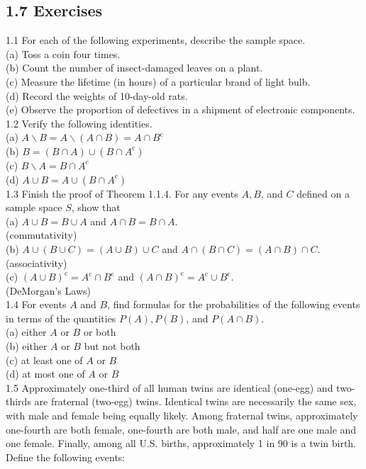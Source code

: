 \documentclass[10pt]{article}
\begin{document}
\subsection*{1.7 Exercises}
1.1 For each of the following experiments, describe the sample space.\\
(a) Toss a coin four times.\\
(b) Count the number of insect-damaged leaves on a plant.\\
(c) Measure the lifetime (in hours) of a particular brand of light bulb.\\
(d) Record the weights of 10-day-old rats.\\
(e) Observe the proportion of defectives in a shipment of electronic components.\\
1.2 Verify the following identities.\\
(a) $A \backslash B=A \backslash(A \cap B)=A \cap B^{\mathrm{c}}$\\
(b) $B=(B \cap A) \cup\left(B \cap A^{\mathrm{c}}\right)$\\
(c) $B \backslash A=B \cap A^{\mathrm{c}}$\\
(d) $A \cup B=A \cup\left(B \cap A^{\mathrm{c}}\right)$\\
1.3 Finish the proof of Theorem 1.1.4. For any events $A, B$, and $C$ defined on a sample space $S$, show that\\
(a) $A \cup B=B \cup A$ and $A \cap B=B \cap A$.\\
(commutativity)\\
(b) $A \cup(B \cup C)=(A \cup B) \cup C$ and $A \cap(B \cap C)=(A \cap B) \cap C$.\\
(associativity)\\
(c) $(A \cup B)^{\mathrm{c}}=A^{\mathrm{c}} \cap B^{\mathrm{c}}$ and $(A \cap B)^{\mathrm{c}}=A^{\mathrm{c}} \cup B^{\mathrm{c}}$.\\
(DeMorgan's Laws)\\
1.4 For events $A$ and $B$, find formulas for the probabilities of the following events in terms of the quantities $P(A), P(B)$, and $P(A \cap B)$.\\
(a) either $A$ or $B$ or both\\
(b) either $A$ or $B$ but not both\\
(c) at least one of $A$ or $B$\\
(d) at most one of $A$ or $B$\\
1.5 Approximately one-third of all human twins are identical (one-egg) and two-thirds are fraternal (two-egg) twins. Identical twins are necessarily the same sex, with male and female being equally likely. Among fraternal twins, approximately one-fourth are both female, one-fourth are both male, and half are one male and one female. Finally, among all U.S. births, approximately 1 in 90 is a twin birth. Define the following events:
\end{document}
